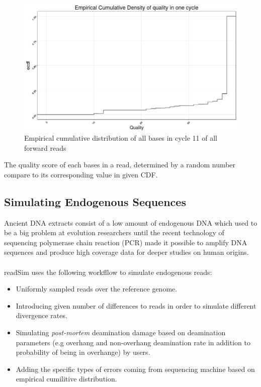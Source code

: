 \documentclass[11pt,a4paper]{report}
\begin{document}
\begin{figure}[H]
\centering
\includegraphics[width=12cm]{pictures/Rplot_ecdf.png}
\caption{Empirical cumulative distribution of all bases in cycle 11 of all forward 
reads}
\label{hist}
\end{figure}

The quality score of each bases in a read, determined by a random number compare to 
its corresponding value in given CDF.

\subsection{Simulating Endogenous Sequences}

Ancient DNA extracts consist of a low amount of endogenous DNA which used to be 
a big problem at evolution researchers until the recent technology of sequencing 
polymerase chain reaction (PCR) \cite{PCR} made it possible to amplify DNA 
sequences and produce high coverage data for deeper studies on human origins.
\\\\
readSim uses the following workfllow to simulate endogenous reads:
\begin{itemize}
 \item Uniformly sampled reads over the reference genome.

 \item Introducing given number of differences to 
 reads in order to simulate different divergence rates.

 \item Simulating \emph{post-mortem} deamination damage based on deamination 
parameters (e.g overhang and non-overhang deamination rate in addition to 
probability of being in overhange) by users. 

 \item Adding the specific types of errors coming from sequencing machine based
on empirical cumilitive distribution.
\end{itemize}
\end{document}
